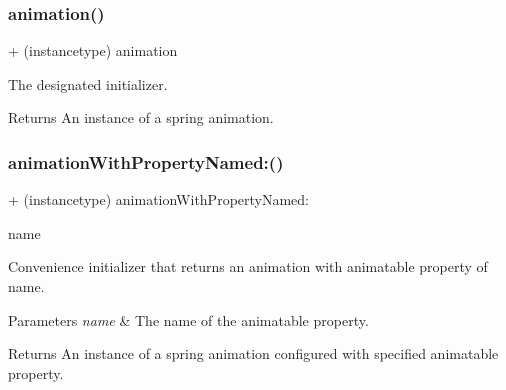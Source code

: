 \subsubsection{\texorpdfstring{animation()}{animation()}\hspace{0.1cm}{\footnotesize\ttfamily [3/3]}}
{\footnotesize\ttfamily + (instancetype) animation \begin{DoxyParamCaption}{ }\end{DoxyParamCaption}}

The designated initializer. \begin{DoxyReturn}{Returns}
An instance of a spring animation. 
\end{DoxyReturn}
\mbox{\label{interface_p_o_p_spring_animation_a6e5bd208ce4b013a884c97dcebfc33b4}} 
\subsubsection{\texorpdfstring{animation\+With\+Property\+Named\+:()}{animationWithPropertyNamed:()}\hspace{0.1cm}{\footnotesize\ttfamily [1/3]}}
{\footnotesize\ttfamily + (instancetype) animation\+With\+Property\+Named\+: \begin{DoxyParamCaption}\item[{(N\+S\+String $\ast$)}]{name }\end{DoxyParamCaption}}

Convenience initializer that returns an animation with animatable property of name. 
\begin{DoxyParams}{Parameters}
{\em name} & The name of the animatable property. \\
\hline
\end{DoxyParams}
\begin{DoxyReturn}{Returns}
An instance of a spring animation configured with specified animatable property. 
\end{DoxyReturn}
\mbox{\label{interface_p_o_p_spring_animation_a6e5bd208ce4b013a884c97dcebfc33b4}} 
